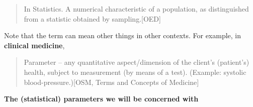 \documentclass[]{book}
\begin{document}
\begin{quote}
In Statistics. A numerical characteristic of a population, as distinguished from a statistic obtained by sampling.{[}OED{]}
\end{quote}

Note that the term can mean other things in other contexts. For example, in \textbf{clinical medicine},

\begin{quote}
Parameter -- any quantitative aspect/dimension of the client's (patient's) health, subject to measurement (by means of a test). (Example: systolic blood-pressure.){[}OSM, Terms and Concepts of Medicine{]}
\end{quote}

\textbf{The (statistical) parameters we will be concerned with}
\end{document}
